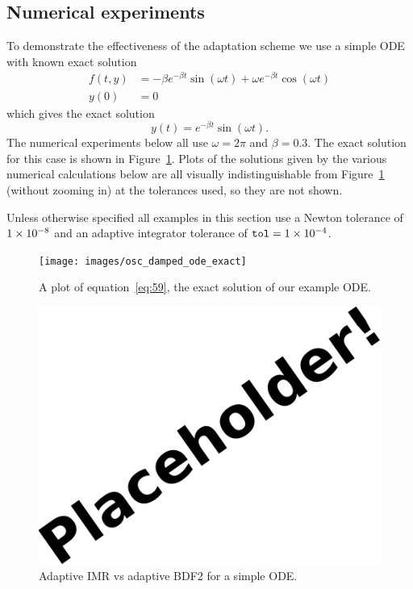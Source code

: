 \subsection{Numerical experiments}

To demonstrate the effectiveness of the adaptation scheme we use a simple ODE with known exact solution
\begin{align}
  f(t,y) &= - \beta e^{-\beta t} \sin(\omega t) + \omega e^{-\beta t} \cos(\omega t) \\
  y(0) &= 0
\end{align}
which gives the exact solution
\begin{equation}
  \label{eq:59}
  y(t) = e^{-\beta t} \sin(\omega t).
\end{equation}
The numerical experiments below all use $\omega = 2 \pi$ and $\beta = 0.3$.
The exact solution for this case is shown in Figure~\ref{fig:mp-ode-exact}.
Plots of the solutions given by the various numerical calculations below are all visually indistinguishable from Figure~\ref{fig:mp-ode-exact} (without zooming in) at the tolerances used, so they are not shown.

Unless otherwise specified all examples in this section use a Newton tolerance of $1\times 10^{-8}$ and an adaptive integrator tolerance of ${\textrm{\textup{\texttt{tol}}}} = 1\times 10^{-4}$.

\begin{figure}[ht!]
  \centering
  \texttt{[image: images/osc\_damped\_ode\_exact]}
  \caption{A plot of equation~\eqref{eq:59}, the exact solution of our example ODE.}
  \label{fig:mp-ode-exact}
\end{figure}

\begin{figure}[ht!]
  \centering
  \includegraphics{images/placeholder}
  \caption{Adaptive IMR vs adaptive BDF2 for a simple ODE.}
  \label{fig:mp-vs-bdf2}
\end{figure}


